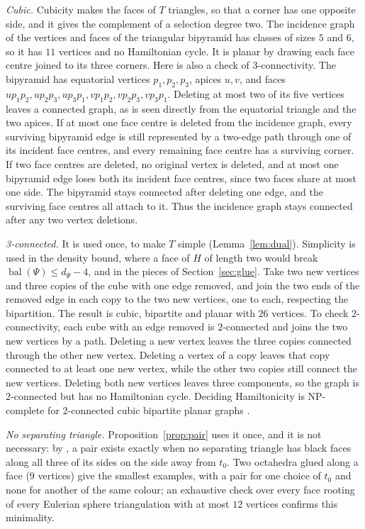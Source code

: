 \documentclass[10pt]{amsart}
\numberwithin{equation}{section}
\theoremstyle{definition}
\theoremstyle{remark}
\newcommand{\T}{T}
\newcommand{\bal}{\operatorname{bal}}
\begin{document}
\emph{Cubic.} Cubicity makes the faces of $\T$ triangles, so that a corner has one opposite side, and it gives the complement of a selection degree two. The incidence graph of the vertices and faces of the triangular bipyramid has classes of sizes $5$ and $6$, so it has $11$ vertices and no Hamiltonian cycle.
It is planar by drawing each face centre joined to its three corners.
Here is also a check of $3$-connectivity.
The bipyramid has equatorial vertices $p_1,p_2,p_3$, apices $u,v$, and faces $up_1p_2,up_2p_3,up_3p_1,vp_1p_2,vp_2p_3,vp_3p_1$.
Deleting at most two of its five vertices leaves a connected graph, as is seen directly from the equatorial triangle and the two apices.
If at most one face centre is deleted from the incidence graph, every surviving bipyramid edge is still represented by a two-edge path through one of its incident face centres, and every remaining face centre has a surviving corner.
If two face centres are deleted, no original vertex is deleted, and at most one bipyramid edge loses both its incident face centres, since two faces share at most one side.
The bipyramid stays connected after deleting one edge, and the surviving face centres all attach to it.
Thus the incidence graph stays connected after any two vertex deletions.

\emph{3-connected.} It is used once, to make $\T$ simple (Lemma~\ref{lem:dual}). Simplicity is used in the density bound, where a face of $H$ of length two would break $\bal(\Psi)\le d_{\Psi}-4$, and in the pieces of Section~\ref{sec:glue}. Take two new vertices and three copies of the cube with one edge removed, and join the two ends of the removed edge in each copy to the two new vertices, one to each, respecting the bipartition. The result is cubic, bipartite and planar with $26$ vertices.
To check $2$-connectivity, each cube with an edge removed is $2$-connected and joins the two new vertices by a path.
Deleting a new vertex leaves the three copies connected through the other new vertex.
Deleting a vertex of a copy leaves that copy connected to at least one new vertex, while the other two copies still connect the new vertices.
Deleting both new vertices leaves three components, so the graph is $2$-connected but has no Hamiltonian cycle. Deciding Hamiltonicity is NP-complete for $2$-connected cubic bipartite planar graphs \cite{Akiyama1980}.

\emph{No separating triangle.} Proposition~\ref{prop:pair} uses it once, and it is not necessary: by \cite[Theorem~1.2]{Anonymous2026}, a pair exists exactly when no separating triangle has black faces along all three of its sides on the side away from $t_0$. Two octahedra glued along a face ($9$ vertices) give the smallest examples, with a pair for one choice of $t_0$ and none for another of the same colour; an exhaustive check over every face rooting of every Eulerian sphere triangulation with at most $12$ vertices confirms this minimality.
\end{document}
